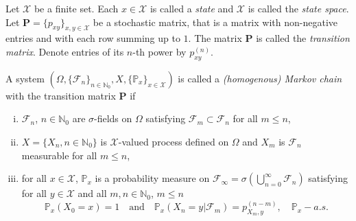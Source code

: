 Let $\mathcal{X}$ be a finite set. Each $x\in\mathcal{X}$ is called a {\em state} and $\mathcal{X}$ is called the {\em state space}. Let $\bm{P}=\{p_{xy}\}_{x,y\in\mathcal{X}}$ be a stochastic matrix, that is a matrix with non-negative entries and with each row summing up to $1$. The matrix $\bm{P}$ is called the {\em transition matrix}. Denote entries of its $n$-th power by $p_{xy}^{(n)}$.

\begin{df} 
\label{DMCdef}
A system $(\Omega,\{\mathcal{F}_{n}\}_{n\in\mathbb{N}_0},X,\{\mathbb{P}_x\}_{x\in\mathcal{X}})$ is called a {\em (homogenous) Markov chain} with the transition matrix $\bm{P}$ if
\begin{enumerate}[(i)]
\item $\mathcal{F}_n$, $n\in\mathbb{N}_0$ are $\sigma$-fields on $\Omega$ satisfying $\mathcal{F}_m\subset \mathcal{F}_n$ for all $m\leq n$,
\item $X=\{X_n, n\in\mathbb{N}_0\}$ is $\mathcal{X}$-valued process defined on $\Omega$ and $X_m$ is $\mathcal{F}_n$ measurable for all $m\leq n$,
\item for all $x\in\mathcal{X}$, $\mathbb{P}_x$ is a probability measure on $\mathcal{F}_\infty=\sigma\left(\bigcup_{n=0}^{\infty}\mathcal{F}_n \right)$ satisfying for all $y\in\mathcal{X}$ and all $m,n \in \mathbb{N}_0$, $m\leq n$
$$\mathbb{P}_x(X_0=x)=1 \quad \text{and} \quad \mathbb{P}_x(X_n=y|\mathcal{F}_m)=p_{X_m,y}^{(n-m)}, \quad \mathbb{P}_x-a.s.$$ 
\end{enumerate}
\end{df}

